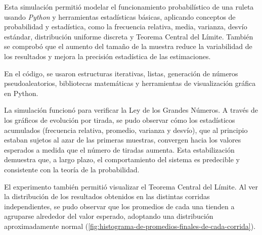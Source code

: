 \documentclass{article}
\begin{document}
Esta simulación permitió modelar el funcionamiento probabilístico de una ruleta usando \textit{Python} y herramientas estadísticas 
básicas, aplicando conceptos de probabilidad y estadística, como la frecuencia relativa, media, varianza, desvío estándar, distribución 
uniforme discreta y Teorema Central del Límite. También se comprobó que el aumento del tamaño de la muestra reduce la variabilidad de 
los resultados y mejora la precisión estadística de las estimaciones.

En el código, se usaron estructuras iterativas, listas, generación de números pseudoaleatorios, bibliotecas matemáticas y herramientas 
de visualización gráfica en Python.

La simulación funcionó para verificar la Ley de los Grandes Números. A través de los gráficos de evolución por tirada, se pudo observar 
cómo los estadísticos acumulados (frecuencia relativa, promedio, varianza y desvío), que al principio estaban sujetos al azar de las 
primeras muestras, convergen hacia los valores esperados a medida que el número de tiradas aumenta. Esta estabilización demuestra que, a 
largo plazo, el comportamiento del sistema es predecible y consistente con la teoría de la probabilidad.

El experimento también permitió visualizar el Teorema Central del Límite. Al ver la distribución de los resultados obtenidos en las 
distintas corridas independientes, se pudo observar que los promedios de cada una tienden a agruparse alrededor del valor esperado, 
adoptando una distribución aproximadamente normal (\cref{fig:histograma-de-promedios-finales-de-cada-corrida}).

\nocite{*}



\end{document}
